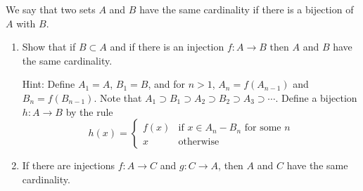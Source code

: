 \begin{exercise}\label{chapter1:section7:exercise6}
    We say that two sets $A$ and $B$ have the same cardinality if there is a bijection of $A$ with $B$.
    \begin{enumerate}[label={(\alph*)}]
        \item Show that if $B\subset A$ and if there is an injection $f: A\to B$ then $A$ and $B$ have the same cardinality.

              Hint: Define $A_{1} = A$, $B_{1} = B$, and for $n > 1$, $A_{n} = f(A_{n-1})$ and $B_{n} = f(B_{n-1})$. Note that $A_{1}\supset B_{1}\supset A_{2}\supset B_{2}\supset A_{3}\supset\cdots$. Define a bijection $h: A\to B$ by the rule \[h(x) = \begin{cases}f(x) & \text{if $x\in A_{n} - B_{n}$ for some $n$} \\ x & \text{otherwise}\end{cases}\]
        \item If there are injections $f: A\to C$ and $g: C\to A$, then $A$ and $C$ have the same cardinality.
    \end{enumerate}
\end{exercise}

